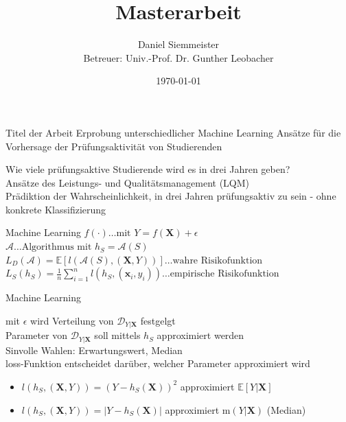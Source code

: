 \documentclass[17pt, fleqn]{beamer}
\title[]{Masterarbeit}
\author[]{\small{Daniel Siemmeister \\[0.8cm]
            Betreuer: Univ.-Prof. Dr. Gunther Leobacher
            }}
\date[]{\small{\today}}
\begin{document}
\begin{frame}[plain]
    \titlepage    
\end{frame}

\begin{frame}{Titel der Arbeit}
\centering
\large{Erprobung unterschiedlicher Machine Learning Ansätze für die Vorhersage der Prüfungsaktivität von Studierenden}
\end{frame}

\begin{frame}
    Wie viele prüfungsaktive Studierende wird es in drei Jahren geben? \\[1cm]
    \pause
    Ansätze des Leistungs- und Qualitätsmanagement (LQM)\\[1cm]
    \pause
    Prädiktion der Wahrscheinlichkeit, in drei Jahren prüfungsaktiv zu sein - ohne konkrete Klassifizierung
\end{frame}


\begin{frame}{Machine Learning}
    \pause
    \small{
    $ f(\cdot) \dots \text{mit } Y = f(\mathbf{X}) + \epsilon $ \\[0.2cm]
    $ \mathcal{A} \dots \text{Algorithmus mit } h_S = \mathcal{A}(S) $ \\[0.2cm]
    $ L_D(\mathcal{A}) = \mathbb{E}[l(\mathcal{A}(S), (\mathbf{X}, Y)) ] \dots \text{wahre Risikofunktion} $ \\[0.2cm]
    $ L_S(h_S) = \frac{1}{n} \sum_{i=1}^n l(h_S, (\mathbf{x}_i, y_i)) \dots \text{empirische Risikofunktion} $ \\[0.2cm]
    }
\end{frame}

\begin{frame}{Machine Learning}
    
    \small{
        mit $ \epsilon $ wird Verteilung von $ \mathcal{D}_{Y|\mathbf{X}} $ festgelgt \\ [0.2cm]
        Parameter von $ \mathcal{D}_{Y|\mathbf{X}} $ soll mittels $ h_S $ approximiert werden \\ [0.2cm]
        \pause
        Sinvolle Wahlen: Erwartungswert, Median \\ [0.2cm]
        loss-Funktion entscheidet darüber, welcher Parameter approximiert wird
        \pause
        \begin{itemize}
            \item $l(h_S, (\mathbf{X}, Y)) = (Y - h_S(\mathbf{X}))^2 $ approximiert $\mathbb{E}[Y|\mathbf{X}] $
            \item $l(h_S, (\mathbf{X}, Y)) = |Y- h_S(\mathbf{X})| $ approximiert $\text{m}(Y|\mathbf{X}) $ (Median) 
        \end{itemize}
    }
\end{frame}
\end{document}
